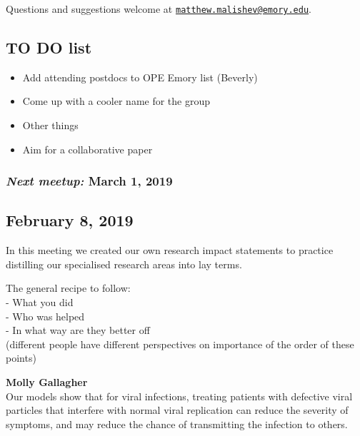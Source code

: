 \documentclass[10,portrait]{article}
\providecommand{\tightlist}{%
  \setlength{\itemsep}{0pt}\setlength{\parskip}{0pt}}
\begin{document}
Questions and suggestions welcome at
\href{mailto:matthew.malishev@emory.edu}{\nolinkurl{matthew.malishev@emory.edu}}.

\newpage  

\subsection{TO DO list}\label{to-do-list}

\begin{itemize}
\tightlist
\item
  Add attending postdocs to OPE Emory list (Beverly)\\
\item
  Come up with a cooler name for the group\\
\item
  Other things\\
\item
  Aim for a collaborative paper
\end{itemize}

\subsubsection{\texorpdfstring{\emph{Next meetup:} March 1,
2019}{Next meetup: March 1, 2019}}\label{next-meetup-march-1-2019}

\newpage  

\subsection{February 8, 2019}\label{february-8-2019}

In this meeting we created our own research impact statements to
practice distilling our specialised research areas into lay terms.

The general recipe to follow:\\
- What you did\\
- Who was helped\\
- In what way are they better off\\
(different people have different perspectives on importance of the order
of these points)

\textbf{Molly Gallagher}\\
Our models show that for viral infections, treating patients with
defective viral particles that interfere with normal viral replication
can reduce the severity of symptoms, and may reduce the chance of
transmitting the infection to others.
\end{document}
